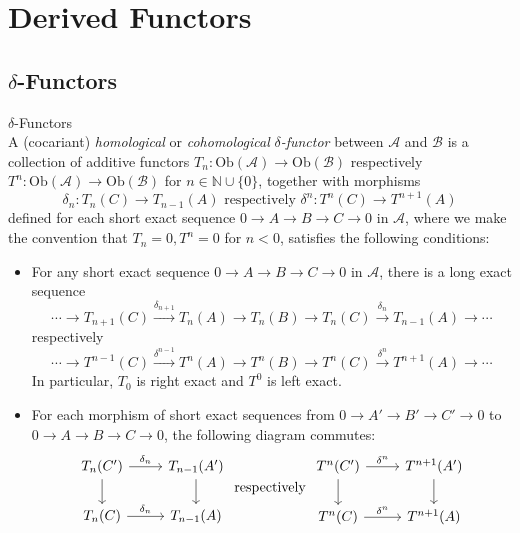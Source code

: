 \section{Derived Functors}

\subsection{$\delta$-Functors}

\begin{definition}{$\delta$-Functors}\\
A (cocariant) \textit{homological} or \textit{cohomological} \textit{$\delta$-functor} between $\mathcal{A}$ and $\mathcal{B}$ is a collection of additive functors $T_n: \text{Ob} (\mathcal{A}) \to \text{Ob} (\mathcal{B})$ respectively $T^n :\text{Ob} (\mathcal{A}) \to \text{Ob} (\mathcal{B})$ for $n \in \mathbb{N} \cup \{0\}$, together with morphisms
\[
\delta_n: T_n (C) \to T_{n-1}(A) \text{ respectively } \delta^n: T^n(C) \to T^{n+1} (A)
\]
defined for each short exact sequence $0\to A\to B\to C\to 0$ in $\mathcal{A}$, where we make the convention that $T_n=0,T^n=0$ for $n<0$, satisfies the following conditions:
\begin{itemize}
    \item For any short exact sequence $0\to A\to B\to C\to 0$ in $\mathcal{A}$, there is a long exact sequence
    \[
    \cdots \to T_{n+1} (C) \xrightarrow{\delta_{n+1}} T_n (A) \to T_n(B) \to T_n(C) \xrightarrow{\delta_n} T_{n-1} (A) \to \cdots 
    \]
    respectively
    \[
    \cdots \to T^{n-1} (C) \xrightarrow{\delta^{n-1}} T^n (A) \to T^n(B) \to T^n(C) \xrightarrow{\delta^n} T^{n+1} (A) \to \cdots
    \]
    In particular, $T_0$ is right exact and $T^0$ is left exact.

    \item For each morphism of short exact sequences from $0 \to A'\to B' \to C' \to0$ to $0\to A\to B\to C\to0$, the following diagram commutes:
    \[
    \begin{tikzcd}
        T_n(C') \arrow[r, "\delta_n"] \arrow[d] &T_{n-1} (A') \arrow[d]\\
        T_n(C) \arrow[r, "\delta_n"] &T_{n-1}(A)
    \end{tikzcd}
    \text{ respectively }
    \begin{tikzcd}
        T^n(C') \arrow[r, "\delta^n"] \arrow[d] &T^{n+1} (A') \arrow[d] \\
        T^n(C) \arrow[r, "\delta^n"] &T^{n+1} (A)
    \end{tikzcd}
    \]
\end{itemize}
\end{definition}

